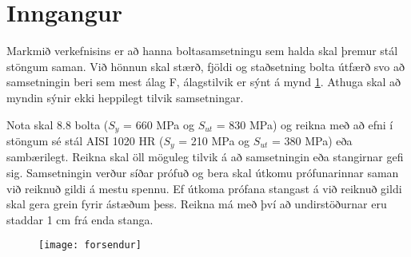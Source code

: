 \documentclass[12pt, draft, isbabel]{rureport}
\begin{document}
\maketitle

\tableofcontents

\listoffixmes

\clearpage

\section{Inngangur}\label{ch::inngangur}

Markmið verkefnisins er að hanna boltasamsetningu sem halda skal þremur stál stöngum saman. 
Við hönnun skal stærð, fjöldi og staðsetning bolta útfærð svo að samsetningin beri sem mest álag F, álagstilvik er sýnt á mynd \ref{fig::forsendur}. 
Athuga skal að myndin sýnir ekki heppilegt tilvik samsetningar. 

Nota skal 8.8 bolta ($S_y$ = 660 MPa og $S_{ut}$ = 830 MPa) og reikna með að efni í stöngum sé stál AISI 1020 HR ($S_y$ = 210 MPa og $S_{ut}$ = 380 MPa) eða sambærilegt. 
Reikna skal öll möguleg tilvik á að samsetningin eða stangirnar gefi sig. Samsetningin verður síðar prófuð og bera skal útkomu prófunarinnar saman við reiknuð gildi á mestu spennu. 
Ef útkoma prófana stangast á við reiknuð gildi skal gera grein fyrir ástæðum þess. 
Reikna má með því að undirstöðurnar eru staddar 1 cm frá enda stanga.

\begin{figure}[h]
	\centering
	\texttt{[image: forsendur]}
	\caption{}
	\label{fig::forsendur}
\end{figure}





\printbibliography
\end{document}
